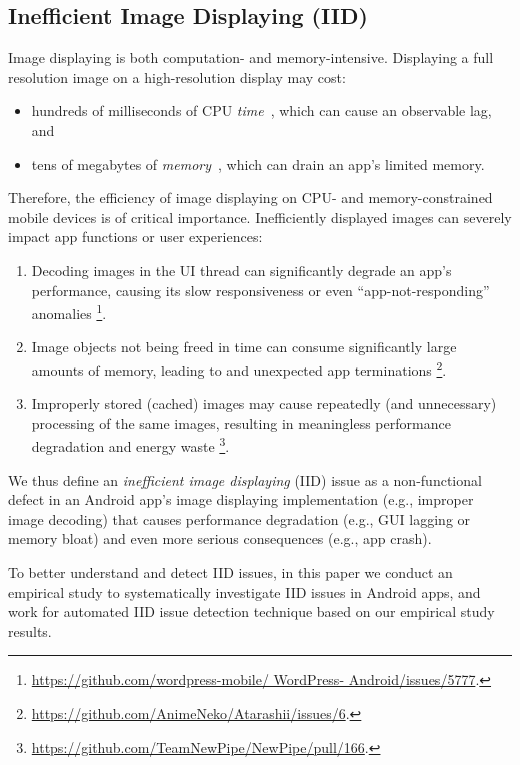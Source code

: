 \subsection{Inefficient Image Displaying (IID)}

Image displaying is both computation- and memory-intensive. Displaying a full resolution image on a high-resolution display may cost:

\begin{itemize}
  \item hundreds of milliseconds of CPU \emph{time}~\cite{wang2016profiling}, which can cause an observable lag, and
  \item tens of megabytes of \emph{memory}~\cite{image_size}, which can drain an app's limited memory.
\end{itemize}

Therefore, the efficiency of image displaying on CPU- and memory-constrained mobile devices is of critical importance.
Inefficiently displayed images can severely impact app functions or user experiences:

\begin{enumerate}
  \item Decoding images in the UI thread can significantly degrade an app's performance, causing its slow responsiveness or even ``app-not-responding'' anomalies%
\footnote{\url{https://github.com/wordpress-mobile/ WordPress- Android/issues/5777}.}.
  \item Image objects not being freed in time can consume significantly large amounts of memory, leading to  and unexpected app terminations%
\footnote{\url{https://github.com/AnimeNeko/Atarashii/issues/6}.}.
  \item Improperly stored (cached) images may cause repeatedly (and unnecessary) processing of the same images, resulting in meaningless performance degradation and energy waste%
\footnote{\url{https://github.com/TeamNewPipe/NewPipe/pull/166}.}.
\end{enumerate}

We thus define an \emph{inefficient image displaying} (IID) issue as a non-functional defect in an Android app's image displaying implementation (e.g., improper image decoding) that causes performance degradation (e.g., GUI lagging or memory bloat) and even more serious consequences (e.g., app crash).

To better understand and detect IID issues,
in this paper we conduct an empirical study to systematically investigate IID issues in Android apps,
and work for automated IID issue detection technique based on our empirical study results.
